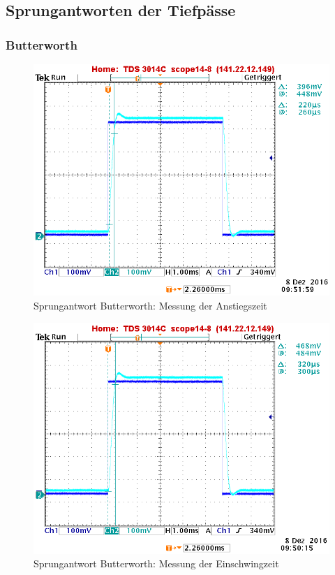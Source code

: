 \clearpage

\subsection{Sprungantworten der Tiefpässe}
\subsubsection{Butterworth}

\begin{figure}[h]
	\centering
	\includegraphics[width=0.60\linewidth]{Bilder/ImLabor/Sprungantwort_5_8_Butter_Anstiegszeit}
	\caption{Sprungantwort Butterworth: Messung der Anstiegszeit}
	\label{fig:Sprungantwort_5_8_Butter_Anstiegszeit_Anhang}
\end{figure}

\begin{figure}[h]
	\centering
	\includegraphics[width=0.60\linewidth]{Bilder/ImLabor/Sprungantwort_5_7_Butter_Einschwingzeit}
	\caption{Sprungantwort Butterworth: Messung der Einschwingzeit}
	\label{fig:Sprungantwort_5_7_Butter_Einschwingzeit}
\end{figure}

